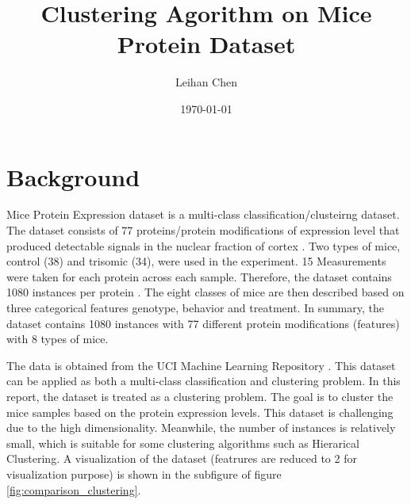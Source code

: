 \documentclass[12pt,a4paper]{article}
\title{Clustering Agorithm on Mice Protein Dataset}
\author{Leihan Chen}
\date{\today}
\begin{document}

\section{Background}
Mice Protein Expression dataset is a multi-class classification/clusteirng dataset. 
The dataset consists of 77 proteins/protein modifications of expression level that produced detectable signals in the nuclear fraction of cortex \cite{mice_protein_expression_342}. 
Two types of mice, control (38) and trisomic (34), were used in the experiment. 15 Measurements were taken for each protein across each sample. Therefore, the dataset contains 1080 instances per protein \cite{Higuera2015SelfOrganizingFM}.
The eight classes of mice are then described based on three categorical features genotype, behavior and treatment. In summary, the dataset contains 1080 instances with 77 different protein modifications (features) with 8 types of mice.

The data is obtained from the UCI Machine Learning Repository \cite{mice_protein_expression_342}. This dataset can be applied as both a multi-class classification and clustering problem. In this report, the dataset is treated as a clustering problem. 
The goal is to cluster the mice samples based on the protein expression levels. This dataset is challenging due to the high dimensionality. 
Meanwhile, the number of instances is relatively small, which is suitable for some clustering algorithms such as Hierarical Clustering. A visualization of the dataset (featrures are reduced to 2 for visualization purpose) is shown in the subfigure of figure \ref{fig:comparison_clustering}.


\end{document}
